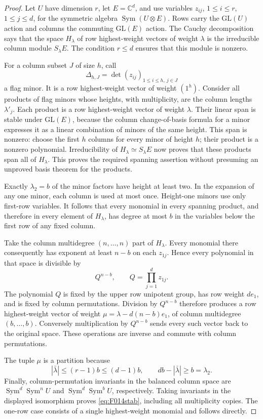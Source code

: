 \begin{proof}
Let \(U\) have dimension \(r\), let \(E=\mathbb C^d\), and use
variables \(z_{ij}\), \(1\leq i\leq r\), \(1\leq j\leq d\),
for the symmetric algebra \(\operatorname{Sym}(U\otimes E)\).
Rows carry the \(\mathrm{GL}(U)\) action and columns the commuting
\(\mathrm{GL}(E)\) action. The Cauchy decomposition says that
the space \(H_\lambda\) of row highest-weight vectors of weight
\(\lambda\) is the irreducible column module \(S_\lambda E\).
The condition \(r\leq d\) ensures that this module is nonzero.

For a column subset \(J\) of size \(h\), call
\[
             \Delta_{h,J}=\det(z_{ij})_{1\leq i\leq h,\ j\in J}
\]
a flag minor. It is a row highest-weight vector of weight
\((1^h)\). Consider all products of flag minors whose heights,
with multiplicity, are the column lengths \(\lambda'_j\).
Each product is a row highest-weight vector of weight \(\lambda\).
Their linear span is stable under \(\mathrm{GL}(E)\), because
the column change-of-basis formula for a minor expresses it
as a linear combination of minors of the same height.
This span is nonzero: choose the first \(h\) columns for every
minor of height \(h\); their product is a nonzero polynomial.
Irreducibility of \(H_\lambda\simeq S_\lambda E\) now proves
that these products span all of \(H_\lambda\).
This proves the required spanning assertion without presuming
an unproved basis theorem for the products.

Exactly \(\lambda_2=b\) of the minor factors have height at
least two. In the expansion of any one minor, each column is
used at most once. Height-one minors use only first-row variables.
It follows that every monomial in every spanning product, and
therefore in every element of \(H_\lambda\), has degree at most
\(b\) in the variables below the first row of any fixed column.

Take the column multidegree \((n,\ldots,n)\) part of
\(H_\lambda\). Every monomial there consequently has exponent
at least \(n-b\) on each \(z_{1j}\). Hence every polynomial in
that space is divisible by
\[
                         Q^{n-b},\qquad Q=\prod_{j=1}^d z_{1j}.
\]
The polynomial \(Q\) is fixed by the upper row unipotent group,
has row weight \(de_1\), and is fixed by column permutations.
Division by \(Q^{n-b}\) therefore produces a row highest-weight
vector of weight \(\mu=\lambda-d(n-b)e_1\), of column
multidegree \((b,\ldots,b)\). Conversely multiplication by
\(Q^{n-b}\) sends every such vector back to the original space.
These operations are inverse and commute with column permutations.

The tuple \(\mu\) is a partition because
\[
 |\bar\lambda|\leq(r-1)b\leq(d-1)b,
                  \qquad db-|\bar\lambda|\geq b=\lambda_2.
\]
Finally, column-permutation invariants in the balanced column
space are \(\operatorname{Sym}^d\operatorname{Sym}^n U\)
and \(\operatorname{Sym}^d\operatorname{Sym}^b U\), respectively.
Taking invariants in the displayed isomorphism proves
\eqref{eq:F014stab}, including all multiplicity copies.
The one-row case consists of a single highest-weight monomial
and follows directly.
\end{proof}

